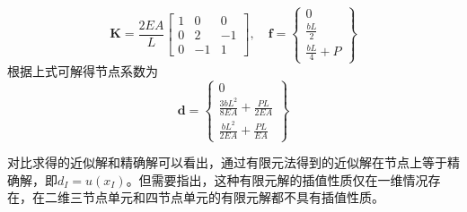 \begin{equation}
\boldsymbol K = \frac{2EA}{L}
\begin{bmatrix}
        1 & 0 & 0 \\
        0 & 2 & -1 \\
        0 & -1 & 1
\end{bmatrix}, \quad
\boldsymbol f =
\begin{Bmatrix}
0 \\ \frac{bL}{2} \\ \frac{bL}{4} + P
\end{Bmatrix}
\end{equation}
根据上式可解得节点系数为
\begin{equation}
\boldsymbol d = 
\begin{Bmatrix}
0 \\ \frac{3bL^2}{8EA} + \frac{PL}{2EA} \\ \frac{bL^2}{2EA} + \frac{PL}{EA}
\end{Bmatrix}
\end{equation} \par
对比求得的近似解和精确解可以看出，通过有限元法得到的近似解在节点上等于精确解，即$d_I = u(x_I)$。但需要指出，这种有限元解的插值性质仅在一维情况存在，在二维三节点单元和四节点单元的有限元解都不具有插值性质。
